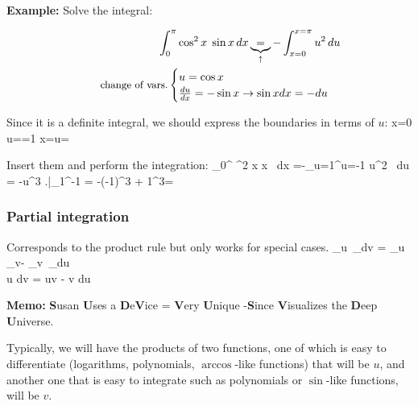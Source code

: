 {\bf Example:} Solve the integral:

\begin{eqnarray*}
\int_0^{\pi} \cos^2 x \; \sin x \, dx \underbrace{=}_{\uparrow} -\int_{x=0}^{x=\pi} u^2 \,du   \\
\quad \quad {\mbox{\small change of vars.}}  \begin{cases} u = \cos x \\ \frac{du}{dx}=-\sin x \rightarrow \sin x dx = -du \end{cases} \\
\end{eqnarray*}

%

Since it is a definite integral, we should express the boundaries in terms of $u$:
\bnn x=0 \quad \rightarrow\quad u==1 \qquad\qquad\qquad\qquad x=\pi \quad \rightarrow\quad u=\cos {} \enn \svs

Insert them and perform the integration:
\bnn
\int_0^{\pi} \cos^2 x \; \sin x \, dx
   =-\int_{u=1}^{u=-1} u^2 \, du = -u^3 \! \left.\frac{}{}\right|_1^{-1} 
   = -(-1)^3 + 1^3=
\enn

\subsubsection{Partial integration}
Corresponds to the product rule but only works for special cases.
\bnn 
\int {}_{u}\, _{dv} = _{u}\, _{v}-\int \: _{v}\, _{du} \\
\int u dv = uv - \int v du 
\enn

{\bf Memo:} {\LARGE {\bf S}}usan {\bf U}ses a {\bf D}e{\bf V}ice = {\bf V}ery {\bf U}nique -{\LARGE{\bf S}}ince {\bf V}isualizes the {\bf D}eep {\bf U}niverse.

Typically, we will have the products of two functions, one of which is easy to differentiate (logarithms, polynomials, $\arccos$-like functions) that will be $u$, and another one that is easy to integrate
such as polynomials or $\sin$-like functions, will be $v$. 

